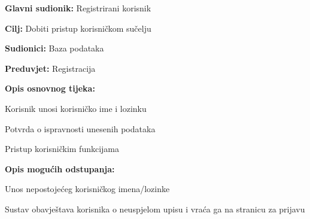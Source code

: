 				
				\noindent {}
				\begin{packed_item}
					
					\item \textbf{Glavni sudionik: }Registrirani korisnik
					\item  \textbf{Cilj:} Dobiti pristup korisničkom sučelju
					\item  \textbf{Sudionici:} Baza podataka
					\item  \textbf{Preduvjet:} Registracija
					\item  \textbf{Opis osnovnog tijeka:}
					
					\item[] \begin{packed_enum}
						
						\item Korisnik unosi korisničko ime i lozinku
						\item Potvrda o ispravnosti unesenih podataka
						\item Pristup korisničkim funkcijama
					\end{packed_enum}
					
					\item  \textbf{Opis mogućih odstupanja:}
					
					\item[] \begin{packed_item}
						
						\item[2.a] Unos nepostojećeg korisničkog imena/lozinke
						\item[] \begin{packed_enum}
							
							\item Sustav obavještava korisnika o neuspjelom upisu i vraća ga na stranicu za prijavu
							
						\end{packed_enum}
						
						
					\end{packed_item}
				\end{packed_item}
			

